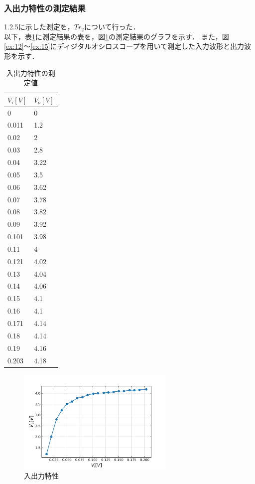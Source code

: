 \documentclass[10pt, a4j, dvipdfmx]{jarticle}
\begin{document}
    \subsubsection{入出力特性の測定結果}
    1.2.5に示した測定を，$Tr_2$について行った．\\
    以下，表\ref{tbl:11}に測定結果の表を，図\ref{ex:11}の測定結果のグラフを示す．
    また，図\ref{ex:12}〜\ref{ex:15}にディジタルオシロスコープを用いて測定した入力波形と出力波形を示す．
    \begin{table}[H]
        \centering
        \caption{入出力特性の測定値}
        \label{tbl:11}
        \small
        \begin{tabular}{|l|l|}
        \hline
        $V_i[V]$ & $V_o[V]$ \\ \hline
        0        & 0        \\ \hline
        0.011    & 1.2      \\ \hline
        0.02     & 2        \\ \hline
        0.03     & 2.8      \\ \hline
        0.04     & 3.22     \\ \hline
        0.05     & 3.5      \\ \hline
        0.06     & 3.62     \\ \hline
        0.07     & 3.78     \\ \hline
        0.08     & 3.82     \\ \hline
        0.09     & 3.92     \\ \hline
        0.101    & 3.98     \\ \hline
        0.11     & 4        \\ \hline
        0.121    & 4.02     \\ \hline
        0.13     & 4.04     \\ \hline
        0.14     & 4.06     \\ \hline
        0.15     & 4.1      \\ \hline
        0.16     & 4.1      \\ \hline
        0.171    & 4.14     \\ \hline
        0.18     & 4.14     \\ \hline
        0.19     & 4.16     \\ \hline
        0.203    & 4.18     \\ \hline
        \end{tabular}
        \normalsize
    \end{table}
    \begin{figure}[H]
        \centering
        \includegraphics[height=50mm]{ex-11.png}
        \caption{入出力特性}
        \label{ex:11}
    \end{figure}
\end{document}
